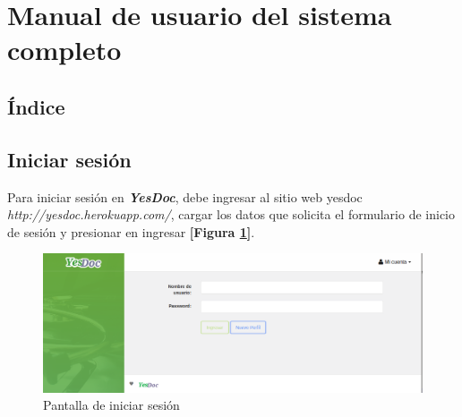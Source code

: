 \section{Manual de usuario del sistema completo}
\label{manual_usuario}


\subsection*{Índice}
\startcontents

\newpage
\clearpage

\subsection{Iniciar sesión}
Para iniciar sesión en \textbf{\textit{YesDoc}}, debe ingresar al sitio web yesdoc \textit{http://yesdoc.herokuapp.com/}, cargar los datos que solicita el formulario de inicio de sesión y presionar en ingresar \textbf{[Figura \ref{mu-iniciar_sesion}]}.
 \begin{figure}
 	\centering
 	\includegraphics[width=.8\textwidth]{img/manual_de_usuario/iniciar_sesion}
 	\caption{Pantalla de iniciar sesión}
 	\label{mu-iniciar_sesion}
 \end{figure}

